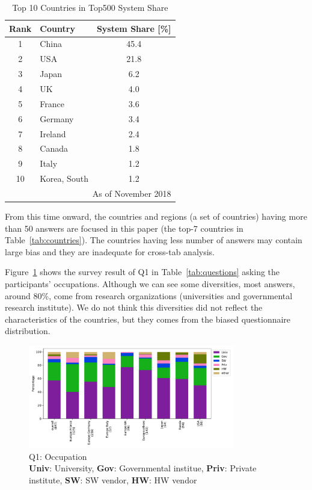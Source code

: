\documentclass[submit,techrep,noauthor,english]{ipsj}
\begin{document}
\begin{table}[htb]%
\begin{center}%
  \caption{Top 10 Countries in Top500 System Share\cite{Top500}}
  \label{tab:top500}%
\begin{tabular}{c|l|c}%
\hline%
Rank & Country & System Share [\%] \\%
\hline%
1 & China & 45.4 \\%
2 & USA & 21.8 \\%
3 & Japan & 6.2 \\%
4 & UK & 4.0 \\%
5 & France & 3.6 \\%
6 & Germany & 3.4 \\%
7 & Ireland & 2.4 \\%
8 & Canada & 1.8 \\%
9 & Italy & 1.2 \\%
10 & Korea, South & 1.2 \\%
\hline%
\multicolumn{3}{r}{\tiny As of November 2018} \\
\end{tabular}%
\end{center}%
\end{table}%

From this time onward, the countries and regions (a set of countries)
having more than 50 answers are focused in this paper (the top-7
countries in Table~\ref{tab:countries}).  The countries
having less number of answers may contain large bias and they are
inadequate for cross-tab analysis. 

Figure~\ref{fig:occupation} shows the survey result of Q1 in
Table~\ref{tab:questions} asking the participants'
occupations. Although we can see some diversities, most answers,
around 80\%, come from research organizations (universities and
governmental research institute).  We do not think this
diversities did not reflect the characteristics of the countries, but
they comes from the biased questionnaire distribution. 

\begin{figure}[htb]
\begin{center}
\includegraphics[width=9cm]{../pdfs/Q1.pdf}
  \vspace{-8mm}
  \caption{Q1: Occupation\\
    {\bf Univ}: University, {\bf Gov}: Governmental institue,
    {\bf Priv}: Private institute, {\bf SW}: SW vendor,
    {\bf HW}: HW vendor}
  \label{fig:occupation}
\end{center}
\end{figure}
\end{document}
